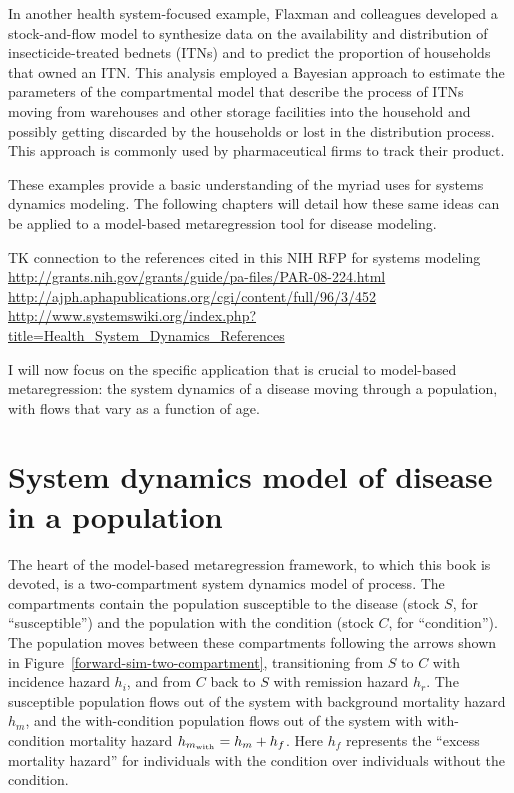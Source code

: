 In another health system-focused example, Flaxman and colleagues
developed a stock-and-flow model to synthesize data on the
availability and distribution of insecticide-treated bednets (ITNs)
and to predict the proportion of households that owned an ITN. This
analysis employed a Bayesian approach to estimate the parameters of
the compartmental model that describe the process of ITNs moving from
warehouses and other storage facilities into the household and
possibly getting discarded by the households or lost in the
distribution process.  This approach is commonly used by
pharmaceutical firms to track their product.

These examples provide a basic understanding of the myriad uses for
systems dynamics modeling. The following chapters will detail how
these same ideas can be applied to a model-based metaregression tool
for disease modeling.




TK connection to the references cited in this NIH RFP for systems modeling
\url{http://grants.nih.gov/grants/guide/pa-files/PAR-08-224.html}
\url{http://ajph.aphapublications.org/cgi/content/full/96/3/452}
\url{http://www.systemswiki.org/index.php?title=Health_System_Dynamics_References}




I will now focus on the specific application that is crucial to
model-based metaregression: the system dynamics of a disease moving
through a population, with flows that vary as a function of age.

\chapter{System dynamics model of disease in a population}
\label{sys-dynamics}
The heart of the model-based metaregression framework, to which this
book is devoted, is a two-compartment system dynamics model of
process. The compartments contain the population susceptible to the
disease (stock $S$, for ``susceptible'') and the population with the
condition (stock $C$, for ``condition''). The population moves between
these compartments following the arrows shown in
Figure~\ref{forward-sim-two-compartment}, transitioning from $S$ to
$C$ with incidence hazard $h_i$, and from $C$ back to $S$ with remission
hazard $h_r$. The susceptible population flows out of the system with
background mortality hazard $h_m$, and the with-condition
population flows out of the system with with-condition mortality hazard
$h_{m_{\text{with}}} = h_m+h_f$.  Here $h_f$ represents the ``excess mortality hazard'' for
individuals with the condition over individuals without the condition.

